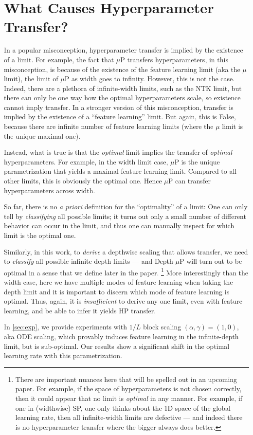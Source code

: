 \section{What Causes Hyperparameter Transfer?}\label{sec:cause_hp}

In a popular misconception, hyperparameter transfer is implied by the existence of a limit.
For example, the fact that $\mu$P transfers hyperparameters, in this misconception, is because of the existence of the feature learning limit (aka the $\mu$ limit), the limit of $\mu$P as width goes to infinity.
However, this is not the case.
Indeed, there are a plethora of infinite-width limits, such as the NTK limit, but there can only be one way how the optimal hyperparameters scale, so existence cannot imply transfer.
In a stronger version of this misconception, transfer is implied by the existence of a ``feature learning'' limit. But again, this is False, because there are infinite number of feature learning limits (where the $\mu$ limit is the unique maximal one).

Instead, what is true is that the \emph{optimal} limit implies the transfer of \emph{optimal} hyperparameters.
For example, in the width limit case, $\mu$P is the unique parametrization that yields a maximal feature learning limit. Compared to all other limits, this is obviously the optimal one. Hence $\mu$P can transfer hyperparameters across width.

So far, there is no \emph{a priori} definition for the ``optimality'' of a limit: One can only tell by \emph{classifying} all possible limits; it turns out only a small number of different behavior can occur in the limit, and thus one can manually inspect for which limit is the optimal one.

Similarly, in this work, to \emph{derive} a depthwise scaling that allows transfer, we need to \emph{classify} all possible infinite depth limits --- and Depth-$\mu$P will turn out to be optimal in a sense that we define later in the paper.%
\footnote{There are important nuances here that will be spelled out in an upcoming paper. For example, if the space of hyperparameters is not chosen correctly, then it could appear that no limit is \emph{optimal} in any manner. For example, if one in (widthwise) SP, one only thinks about the 1D space of the global learning rate, then all infinite-width limits are defective --- and indeed there is no hyperparameter transfer where the bigger always does better.}
More interestingly than the width case, here we have multiple modes of feature learning when taking the depth limit and it is important to discern which mode of feature learning is optimal.
Thus, again, it is \emph{insufficient} to derive any one limit, even with feature learning, and be able to infer it yields HP transfer.

In \cref{sec:exp}, we provide experiments with $1/L$ block scaling $(\alpha, \gamma) = (1, 0)$, aka ODE scaling, which provably induces feature learning in the infinite-depth limit, but is sub-optimal. Our results show a significant shift in the optimal learning rate with this parametrization.